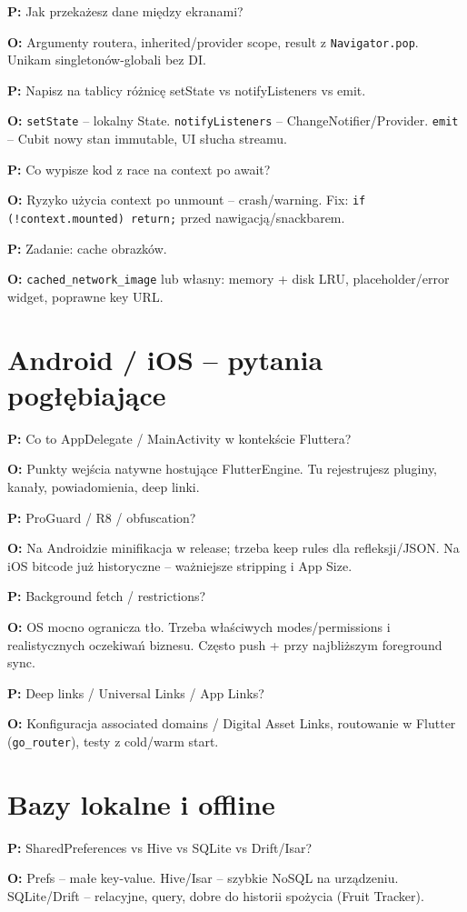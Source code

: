 \documentclass[11pt,a4paper]{article}
\newcommand{\pyt}[1]{\par\medskip\noindent\textbf{P:} #1\par}
\newcommand{\odp}[1]{\noindent\textbf{O:} #1\par}
\begin{document}
\pyt{Jak przekażesz dane między ekranami?}
\odp{Argumenty routera, inherited/provider scope, result z \texttt{Navigator.pop}. Unikam singletonów-globali bez DI.}

\pyt{Napisz na tablicy różnicę setState vs notifyListeners vs emit.}
\odp{\texttt{setState} -- lokalny State. \texttt{notifyListeners} -- ChangeNotifier/Provider. \texttt{emit} -- Cubit nowy stan immutable, UI słucha streamu.}

\pyt{Co wypisze kod z race na context po await?}
\odp{Ryzyko użycia context po unmount -- crash/warning. Fix: \texttt{if (!context.mounted) return;} przed nawigacją/snackbarem.}

\pyt{Zadanie: cache obrazków.}
\odp{\texttt{cached\_network\_image} lub własny: memory + disk LRU, placeholder/error widget, poprawne key URL.}

\section{Android / iOS -- pytania pogłębiające}

\pyt{Co to AppDelegate / MainActivity w kontekście Fluttera?}
\odp{Punkty wejścia natywne hostujące FlutterEngine. Tu rejestrujesz pluginy, kanały, powiadomienia, deep linki.}

\pyt{ProGuard / R8 / obfuscation?}
\odp{Na Androidzie minifikacja w release; trzeba keep rules dla refleksji/JSON. Na iOS bitcode już historyczne -- ważniejsze stripping i App Size.}

\pyt{Background fetch / restrictions?}
\odp{OS mocno ogranicza tło. Trzeba właściwych modes/permissions i realistycznych oczekiwań biznesu. Często push + przy najbliższym foreground sync.}

\pyt{Deep links / Universal Links / App Links?}
\odp{Konfiguracja associated domains / Digital Asset Links, routowanie w Flutter (\texttt{go\_router}), testy z cold/warm start.}

\section{Bazy lokalne i offline}

\pyt{SharedPreferences vs Hive vs SQLite vs Drift/Isar?}
\odp{Prefs -- małe key-value. Hive/Isar -- szybkie NoSQL na urządzeniu. SQLite/Drift -- relacyjne, query, dobre do historii spożycia (Fruit Tracker).}
\end{document}
